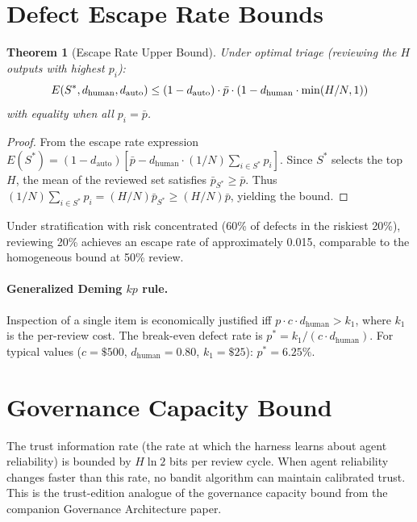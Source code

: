 \documentclass[11pt, a4paper, copyright]{googledeepmind}
\newtheorem{theorem}{Theorem}[section]
\begin{document}
\begin{appendices}

\section{Defect Escape Rate Bounds}
\label{app:escape}

\begin{theorem}[Escape Rate Upper Bound]
\label{thm:escape-bound}
Under optimal triage (reviewing the $H$ outputs with highest $p_i$):
\begin{equation}
E(S^*, d_{\textup{human}}, d_{\textup{auto}}) \leq (1 - d_{\textup{auto}}) \cdot \bar{p} \cdot \left(1 - d_{\textup{human}} \cdot \min(H/N, 1)\right)
\end{equation}
with equality when all $p_i = \bar{p}$.
\end{theorem}

\begin{proof}
From the escape rate expression $E(S^*) = (1-d_{\text{auto}})[\bar{p} - d_{\text{human}} \cdot (1/N)\sum_{i \in S^*} p_i]$. Since $S^*$ selects the top $H$, the mean of the reviewed set satisfies $\bar{p}_{S^*} \geq \bar{p}$. Thus $(1/N)\sum_{i \in S^*} p_i = (H/N)\bar{p}_{S^*} \geq (H/N)\bar{p}$, yielding the bound.
\end{proof}

Under stratification with risk concentrated (60\% of defects in the riskiest 20\%), reviewing 20\% achieves an escape rate of approximately 0.015, comparable to the homogeneous bound at 50\% review.

\paragraph{Generalized Deming $kp$ rule.} Inspection of a single item is economically justified iff $p \cdot c \cdot d_{\text{human}} > k_1$, where $k_1$ is the per-review cost. The break-even defect rate is $p^* = k_1 / (c \cdot d_{\text{human}})$. For typical values ($c = \$500$, $d_{\text{human}} = 0.80$, $k_1 = \$25$): $p^* = 6.25\%$.

\section{Governance Capacity Bound}
\label{app:governance}

The trust information rate (the rate at which the harness learns about agent reliability) is bounded by $H \ln 2$ bits per review cycle. When agent reliability changes faster than this rate, no bandit algorithm can maintain calibrated trust. This is the trust-edition analogue of the governance capacity bound from the companion Governance Architecture paper.


\end{appendices}
\end{document}
